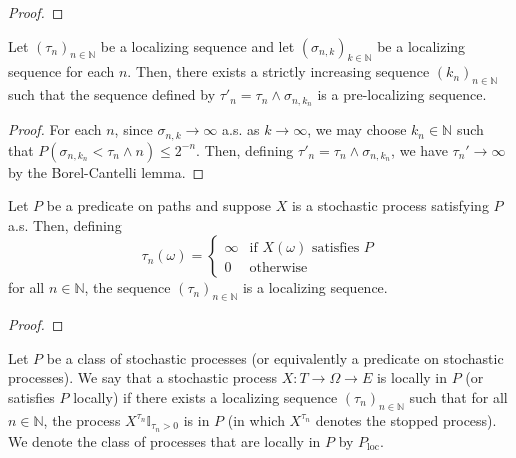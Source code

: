 \begin{proof}\leanok

\end{proof}


\begin{lemma}\label{lem:isPreLocalizingSequence_of_isLocalizingSequence}
  \leanok
Let $(\tau_n)_{n \in \mathbb{N}}$ be a localizing sequence and let $(\sigma_{n,k})_{k \in \mathbb{N}}$ be a localizing sequence for each $n$.
Then, there exists a strictly increasing sequence $(k_n)_{n \in \mathbb{N}}$ such that the sequence defined by $\tau'_n = \tau_n \wedge \sigma_{n,k_n}$ is a pre-localizing sequence.
\end{lemma}

\begin{proof}\leanok
  For each $n$, since $\sigma_{n,k} \to \infty$ a.s. as $k \to \infty$, we may choose $k_n \in \mathbb{N}$ such that $P(\sigma_{n,k_n} < \tau_n \wedge n) \le 2^{-n}$.
  Then, defining $\tau'_n = \tau_n \wedge \sigma_{n,k_n}$, we have $\tau_n' \to \infty$ by the Borel-Cantelli lemma.
\end{proof}


\begin{lemma}\label{lem:isLocalizingSequence_ae}
  \leanok
  Let $P$ be a predicate on paths and suppose $X$ is a stochastic process satisfying $P$ a.s. Then, defining
  $$\tau_n(\omega) =
  \begin{cases}
    \infty & \text{if } X(\omega) \text{ satisfies } P \\
    0 & \text{otherwise}
  \end{cases}
  $$
  for all $n \in \mathbb{N}$, the sequence $(\tau_n)_{n \in \mathbb{N}}$ is a localizing sequence.
\end{lemma}

\begin{proof}\leanok
\end{proof}


\begin{definition}\label{def:locally}
  \mathlibok
Let $P$ be a class of stochastic processes (or equivalently a predicate on stochastic processes).
We say that a stochastic process $X : T \to \Omega \to E$ is locally in $P$ (or satisfies $P$ locally) if there exists a localizing sequence $(\tau_n)_{n \in \mathbb{N}}$ such that for all $n \in \mathbb{N}$, the process $X^{\tau_n}\mathbb{I}_{\tau_n > 0}$ is in $P$ (in which $X^{\tau_n}$ denotes the stopped process).
We denote the class of processes that are locally in $P$ by $P_{\mathrm{loc}}$.
\end{definition}


